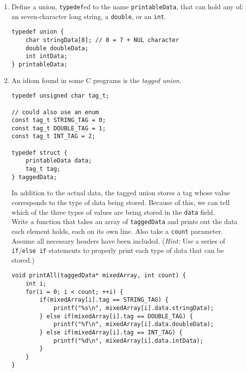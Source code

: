 \begin{enumerate}

\item Define a union, \texttt{typedef}ed to the name \texttt{printableData}, that can hold any of: an seven-character long string, a \texttt{double}, or an \texttt{int}.

\begin{answer}
\begin{verbatim}
typedef union {
    char stringData[8]; // 8 = 7 + NUL character
    double doubleData;
    int intData;
} printableData;
\end{verbatim}
\end{answer}

\item An idiom found in some C programs is the \textit{tagged union}.

\begin{verbatim}
typedef unsigned char tag_t;

// could also use an enum
const tag_t STRING_TAG = 0;
const tag_t DOUBLE_TAG = 1;
const tag_t INT_TAG = 2;

typedef struct {
    printableData data;
    tag_t tag;
} taggedData;
\end{verbatim}

In addition to the actual data, the tagged union stores a tag whose value corresponds to the type of data being stored. Because of this, we can tell which of the three types of values are being stored in the \texttt{data} field.\\
Write a function that takes an array of \texttt{taggedData} and prints out the data each element holds, each on its own line. Also take a \texttt{count} parameter. Assume all necessary headers have been included. (\textit{Hint:} Use a series of \texttt{if}/\texttt{else if} statements to properly print each type of data that can be stored.)

\begin{answer}
\begin{verbatim}
void printAll(taggedData* mixedArray, int count) {
    int i;
    for(i = 0; i < count; ++i) {
        if(mixedArray[i].tag == STRING_TAG) {
            printf("%s\n", mixedArray[i].data.stringData);
        } else if(mixedArray[i].tag == DOUBLE_TAG) {
            printf("%f\n", mixedArray[i].data.doubleData);
        } else if(mixedArray[i].tag == INT_TAG) {
            printf("%d\n", mixedArray[i].data.intData);
        }
    }
}
\end{verbatim}
\end{answer}


\end{enumerate}
